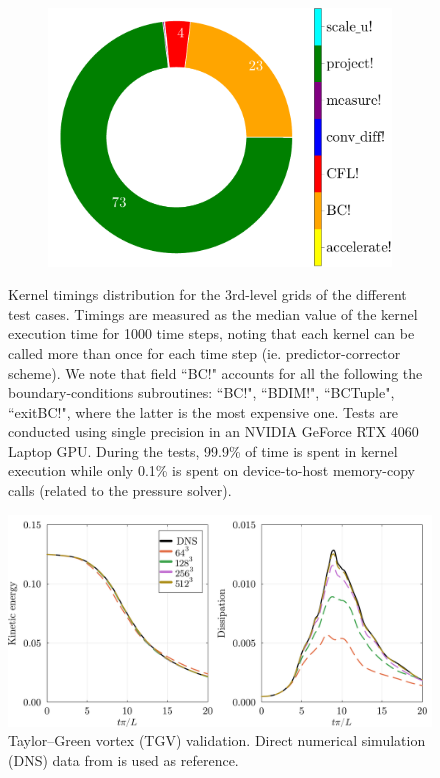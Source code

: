 \documentclass[final,3p,times]{elsarticle}
\begin{document}
\begin{figure}[!ht]
\begin{subfigure}[t]{0.33\linewidth}
{      \includegraphics[width=\linewidth]{img/cylinder_profile.pdf}%
    }
  \end{subfigure}
  \caption{Kernel timings distribution for the 3rd-level grids of the different test cases. Timings are measured as the median value of the kernel execution time for 1000 time steps, noting that each kernel can be called more than once for each time step (ie. predictor-corrector scheme). We note that field ``BC!" accounts for all the following the boundary-conditions subroutines: ``BC!", ``BDIM!", ``BCTuple", ``exitBC!", where the latter is the most expensive one. Tests are conducted using single precision in an NVIDIA GeForce RTX 4060 Laptop GPU. During the tests, 99.9\% of time is spent in kernel execution while only 0.1\% is spent on device-to-host memory-copy calls (related to the pressure solver).}
\label{fig:profiling}
\end{figure}

\begin{figure}[!ht]
    \centering
    \includegraphics[width=0.8\linewidth]{img/tgv.pdf}
	\caption{Taylor--Green vortex (TGV) validation. Direct numerical simulation (DNS) data from \cite{Dairay2017} is used as reference.}
	\label{fig:tgv}
\end{figure}
\end{document}
